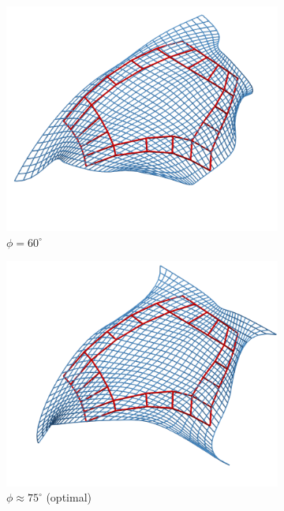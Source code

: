 \documentclass[9pt,academicons]{article}
\begin{document}
\begin{figure}[!ht]
  {
    \hfill
    \begin{subfigure}{.28\textwidth}
      \includegraphics[width=\textwidth]{images/rotations/60.png}
      \caption{$\phi=60^\circ$}
    \end{subfigure}
    \hfill
    \begin{subfigure}{.28\textwidth}
      \centering
      \includegraphics[width=\textwidth]{images/rotations/75-optimal.png}
      \caption{$\phi\approx 75^\circ$ (optimal)}
    \end{subfigure}
    \hfill
    \begin{subfigure}{.28\textwidth}

\end{subfigure}}
\end{figure}
\end{document}
